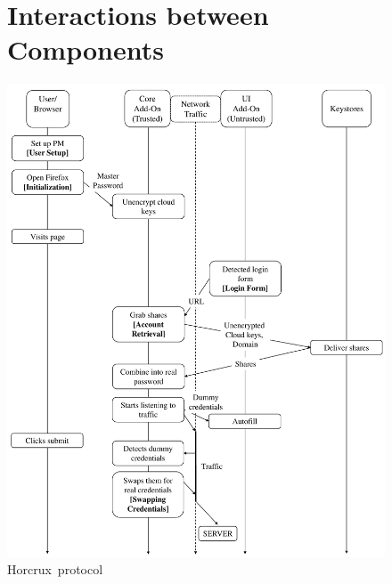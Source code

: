 \documentclass[sigconf]{acmart}
\newcommand*\SecPass{Horcrux}
\begin{document}










% 

%


\appendix


\begin{figure}[!ht]
\section{Interactions between Components}
\centering
\includegraphics[height={0.9\textheight}]{Horcrux_protocol.pdf}
\caption{\SecPass\ protocol }
\label{horcrux_diagram}
\end{figure}
\clearpage
\end{document}
